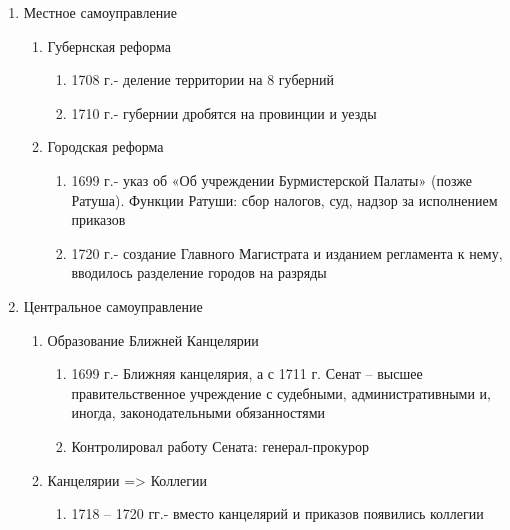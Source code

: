 \begin{enumerate}
    \item{ Местное самоуправление 
        \begin{enumerate}
            \item { Губернская реформа
                \begin{enumerate}
                    \item { 1708 г.- деление территории на 8 губерний }
                    \item { 1710 г.- губернии дробятся на провинции и уезды }
                \end{enumerate}
            }
            \item{ Городская реформа
                \begin{enumerate}
                    \item{ 1699 г.- указ об «Об учреждении Бурмистерской Палаты» (позже Ратуша). Функции Ратуши: сбор налогов, суд, надзор за исполнением приказов}
                    \item{ 1720 г.- создание Главного Магистрата и изданием регламента к нему, вводилось разделение городов на разряды }
                \end{enumerate}
            }
        \end{enumerate}
    }
    \item {Центральное самоуправление
        \begin{enumerate}
            \item{ Образование Ближней Канцелярии
                \begin{enumerate}
                    \item{ 1699 г.- Ближняя канцелярия, а с 1711 г. Сенат – высшее правительственное учреждение с судебными, административными и, иногда, законодательными обязанностями}
                    \item{ Контролировал работу Сената: генерал-прокурор}
                \end{enumerate}
            }
            \item{ Канцелярии => Коллегии
                \begin{enumerate}
                    \item{ 1718 – 1720 гг.- вместо канцелярий и приказов появились коллегии }
                \end{enumerate}
            }
        \end{enumerate}
    }
\end{enumerate}

